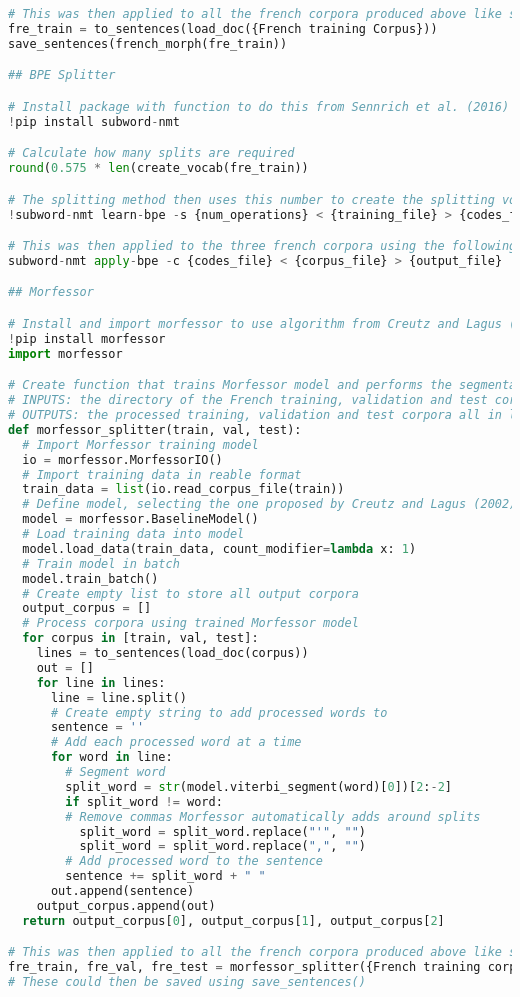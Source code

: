 \documentclass[11pt]{article}
\begin{document}
\begin{lstlisting}[language=Python]
# This was then applied to all the french corpora produced above like so:
fre_train = to_sentences(load_doc({French training Corpus}))
save_sentences(french_morph(fre_train))

## BPE Splitter

# Install package with function to do this from Sennrich et al. (2016)
!pip install subword-nmt

# Calculate how many splits are required
round(0.575 * len(create_vocab(fre_train))

# The splitting method then uses this number to create the splitting vocabulary
!subword-nmt learn-bpe -s {num_operations} < {training_file} > {codes_file}

# This was then applied to the three french corpora using the following line
subword-nmt apply-bpe -c {codes_file} < {corpus_file} > {output_file}

## Morfessor

# Install and import morfessor to use algorithm from Creutz and Lagus (2002)
!pip install morfessor
import morfessor

# Create function that trains Morfessor model and performs the segmentation on the data
# INPUTS: the directory of the French training, validation and test corpora
# OUTPUTS: the processed training, validation and test corpora all in list form
def morfessor_splitter(train, val, test):
  # Import Morfessor training model
  io = morfessor.MorfessorIO()
  # Import training data in reable format
  train_data = list(io.read_corpus_file(train))
  # Define model, selecting the one proposed by Creutz and Lagus (2002)
  model = morfessor.BaselineModel()
  # Load training data into model
  model.load_data(train_data, count_modifier=lambda x: 1)
  # Train model in batch
  model.train_batch()
  # Create empty list to store all output corpora
  output_corpus = []
  # Process corpora using trained Morfessor model
  for corpus in [train, val, test]:
    lines = to_sentences(load_doc(corpus))
    out = []
    for line in lines:
      line = line.split()
      # Create empty string to add processed words to
      sentence = ''
      # Add each processed word at a time
      for word in line:
        # Segment word
        split_word = str(model.viterbi_segment(word)[0])[2:-2]
        if split_word != word:
        # Remove commas Morfessor automatically adds around splits
          split_word = split_word.replace("'", "")
          split_word = split_word.replace(",", "")
        # Add processed word to the sentence
        sentence += split_word + " "
      out.append(sentence)
    output_corpus.append(out)
  return output_corpus[0], output_corpus[1], output_corpus[2]

# This was then applied to all the french corpora produced above like so:
fre_train, fre_val, fre_test = morfessor_splitter({French training corpus}, {French validation corpus}, {French test corpus})
# These could then be saved using save_sentences()
\end{lstlisting}
\end{document}
